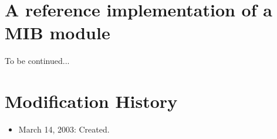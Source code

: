 \documentclass[11pt]{article}
\begin{document}
\section{A reference implementation of a MIB module}

To be continued...


\appendix
\section{Modification History}

\begin{itemize}

  \item March 14, 2003: Created.

\end{itemize}




\end{document}
